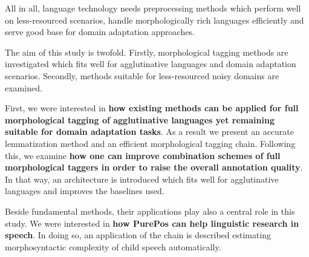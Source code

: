 All in all, language technology needs preprocessing methods which perform well on less-resourced scenarios, handle morphologically rich languages efficiently and serve good base for domain adaptation approaches.


The aim of this study is twofold. 
Firstly, morphological tagging methods are investigated which fits well for agglutinative languages and domain adaptation scenarios. 
Secondly, methods suitable for less-resourced noisy domains are examined.

First, we were interested in \textbf{how existing methods can be applied for full morphological tagging of agglutinative languages yet remaining suitable for domain adaptation tasks}. 
As a result we present an accurate lemmatization method and an efficient morphological tagging chain.
Following this, we examine \textbf{how one can improve combination schemes of full morphological taggers in order to raise the overall annotation quality}.
In that way, an architecture is introduced which fits well for agglutinative languages and improves the baselines used.


Beside fundamental methods, their applications play also a central role in this study.
We were interested in \textbf{how PurePos can help linguistic research in speech}.
In doing so, 
an application of the chain is described estimating morphosyntactic complexity of child speech automatically.


